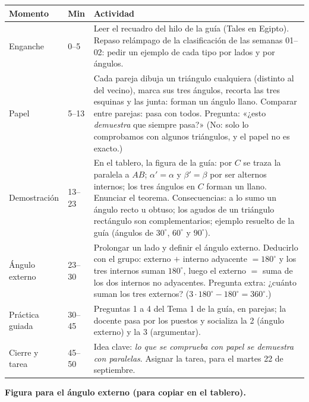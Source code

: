 \documentclass[11pt]{article}
\begin{document}
\begin{center}
{\renewcommand{\arraystretch}{1.3}
\begin{tabularx}{\linewidth}{@{}l l X@{}}
  \toprule
  \textbf{Momento} & \textbf{Min} & \textbf{Actividad}\\
  \midrule
  Enganche & 0--5 & Leer el recuadro del hilo de la guía (Tales en Egipto). Repaso
    relámpago de la clasificación de las semanas 01--02: pedir un ejemplo de cada tipo por
    lados y por ángulos.\\
  Papel & 5--13 & Cada pareja dibuja un triángulo cualquiera (distinto al del vecino),
    marca sus tres ángulos, recorta las tres esquinas y las junta: forman un ángulo llano.
    Comparar entre parejas: pasa con todos. Pregunta: «¿esto \emph{demuestra} que siempre
    pasa?» (No: solo lo comprobamos con algunos triángulos, y el papel no es exacto.)\\
  Demostración & 13--23 & En el tablero, la figura de la guía: por $C$ se traza la
    paralela a $AB$; $\alpha'=\alpha$ y $\beta'=\beta$ por ser alternos internos; los tres
    ángulos en $C$ forman un llano. Enunciar el teorema. Consecuencias: a lo sumo un ángulo
    recto u obtuso; los agudos de un triángulo rectángulo son complementarios; ejemplo
    resuelto de la guía (ángulos de $30^\circ$, $60^\circ$ y $90^\circ$).\\
  Ángulo externo & 23--30 & Prolongar un lado y definir el ángulo externo. Deducirlo con
    el grupo: externo $+$ interno adyacente $=180^\circ$ y los tres internos suman
    $180^\circ$, luego el externo $=$ suma de los dos internos no adyacentes. Pregunta
    extra: ¿cuánto suman los tres externos? ($3\cdot180^\circ-180^\circ=360^\circ$.)\\
  Práctica guiada & 30--45 & Preguntas 1 a 4 del Tema 1 de la guía, en parejas; la
    docente pasa por los puestos y socializa la 2 (ángulo externo) y la 3 (argumentar).\\
  Cierre y tarea & 45--50 & Idea clave: \emph{lo que se comprueba con papel se demuestra
    con paralelas}. Asignar la tarea, para el martes 22 de septiembre.\\
  \bottomrule
\end{tabularx}}
\end{center}

\textbf{Figura para el ángulo externo (para copiar en el tablero).}
\end{document}
